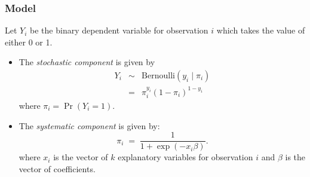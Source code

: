 \documentclass{article}
\begin{document}
\subsubsection{Model}
Let $Y_i$ be the binary dependent variable for observation $i$ which
takes the value of either 0 or 1.
\begin{itemize}

\item The \emph{stochastic component} is given by  
\begin{eqnarray*}
Y_i &\sim& \textrm{Bernoulli}(y_i \mid \pi_i) \\
    &=& \pi_i^{y_i} (1-\pi_i)^{1-y_i}
\end{eqnarray*}
where $\pi_i=\Pr(Y_i=1)$.

\item The \emph{systematic component} is given by: 
\begin{equation*}
\pi_i \; = \; \frac{1}{1 + \exp(-x_i \beta)}.
\end{equation*}
where $x_i$ is the vector of $k$ explanatory variables for observation $i$
and $\beta$ is the vector of coefficients.
\end{itemize}
\end{document}
